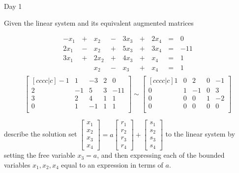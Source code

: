 \begin{applicationActivities}{Day 1}
\begin{activity}{0}
  Given the linear system and its equivalent augmented matrices
  \begin{multicols}{2}\noindent
    \begin{alignat*}{5}
      -x_1 &\,+\,&  x_2 &\,-\,&  3x_3 &\,+\,&  2x_4 &\,=\,& 0 \\
      2x_1 &\,-\,&  x_2 &\,+\,&  5x_3 &\,+\,&  3x_4 &\,=\,& -11 \\
      3x_1 &\,+\,& 2x_2 &\,+\,&  4x_3 &\,+\,&   x_4 &\,=\,& 1 \\
           &\, \,&  x_2 &\,-\,&   x_3 &\,+\,&   x_4 &\,=\,& 1 \\
    \end{alignat*}
  \[
    \begin{bmatrix}[cccc|c]
      -1 &  1 & -3 &  2 &  0 \\
       2 & -1 &  5 &  3 & -11 \\
       3 &  2 &  4 &  1 &  1 \\
       0 &  1 & -1 &  1 &  1 \\
    \end{bmatrix}\sim
    \begin{bmatrix}[cccc|c]
       1 &  0 &  2 &  0 & -1 \\
       0 &  1 & -1 &  0 &  3 \\
       0 &  0 &  0 &  1 & -2 \\
       0 &  0 &  0 &  0 &  0 \\
    \end{bmatrix}
  \]
  \end{multicols}
  describe the solution set
  \(
    \begin{bmatrix}
      x_1 \\
      x_2 \\
      x_3 \\
      x_4
    \end{bmatrix}=
    a\begin{bmatrix}
      r_1 \\
      r_2 \\
      r_3 \\
      r_4
    \end{bmatrix}+
    \begin{bmatrix}
      s_1 \\
      s_2 \\
      s_3 \\
      s_4
    \end{bmatrix}
  \) to the linear system by setting the free variable
  \(x_3=a\), and then expressing each of the
  bounded variables \(x_1,x_2,x_4\) equal to an expression in terms
  of \(a\).
\end{activity}


\end{applicationActivities}
